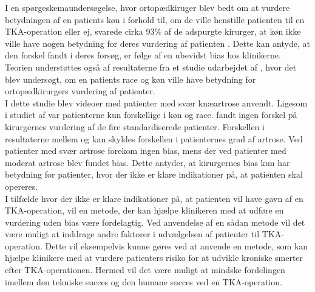 I en spørgeskemaundersøgelse, hvor ortopædkiruger blev bedt om at vurdere betydningen af en patients køn i forhold til, om de ville henstille patienten til en TKA-operation eller ej, svarede cirka 93\% af de adspurgte kirurger, at køn ikke ville have nogen betydning for deres vurdering af patienten \citep{wright1995}. Dette kan antyde, at den forskel  fandt i deres forsøg, er følge af en ubevidst bias hos klinikerne. Teorien understøttes også af resultaterne fra et studie udarbejdet af , hvor det blev undersøgt, om en patients race og køn ville have betydning for ortopædkirurgers vurdering af patienter.\\
I dette studie blev videoer med patienter med svær knæartrose anvendt. Ligesom i studiet af  var patienterne kun forskellige i køn og race.  fandt ingen forskel på kirurgernes vurdering af de fire standardiserede patienter. Forskellen i resultaterne mellem  og  kan skyldes forskellen i patienternes grad af artrose. Ved patienter med svær artrose forekom ingen bias, mens der ved patienter med moderat artrose blev fundet bias. Dette antyder, at kirurgernes bias kun har betydning for patienter, hvor der ikke er klare indikationer på, at patienten skal opereres.\\
I tilfælde hvor der ikke er klare indikationer på, at patienten vil have gavn af en TKA-operation, vil en metode, der kan hjælpe klinikeren med at udføre en vurdering uden bias være fordelagtig. Ved anvendelse af en sådan metode vil det være muligt at inddrage andre faktorer i udvælgelsen af patienter til TKA-operation. Dette vil eksempelvis kunne gøres ved at anvende en metode, som kan hjælpe klinikere med at vurdere patienters risiko for at udvikle kroniske smerter efter TKA-operationen. Hermed vil det være muligt at mindske fordelingen imellem den tekniske succes og den humane succes ved en TKA-operation.

